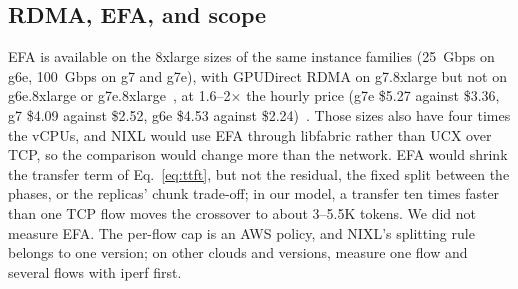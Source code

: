 \documentclass[11pt]{article}
\begin{document}
\subsection{RDMA, EFA, and scope}
EFA is available on the 8xlarge sizes of the same instance families (25~Gbps on g6e, 100~Gbps on g7 and g7e), with GPUDirect RDMA on g7.8xlarge but not on g6e.8xlarge or g7e.8xlarge~\cite{awsefa,awsspecs}, at 1.6--2$\times$ the hourly price (g7e \$5.27 against \$3.36, g7 \$4.09 against \$2.52, g6e \$4.53 against \$2.24)~\cite{awspricing}. Those sizes also have four times the vCPUs, and NIXL would use EFA through libfabric rather than UCX over TCP, so the comparison would change more than the network. EFA would shrink the transfer term of Eq.~\eqref{eq:ttft}, but not the residual, the fixed split between the phases, or the replicas' chunk trade-off; in our model, a transfer ten times faster than one TCP flow moves the crossover to about 3--5.5K tokens. We did not measure EFA. The per-flow cap is an AWS policy, and NIXL's splitting rule belongs to one version; on other clouds and versions, measure one flow and several flows with iperf first.
\end{document}

